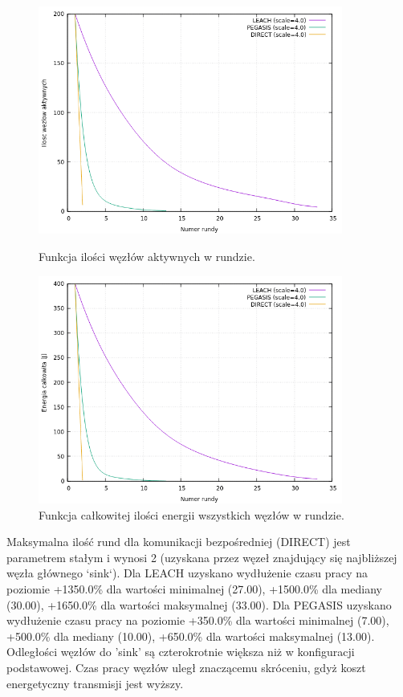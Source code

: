 \documentclass[a4paper,12pt,twoside,openany]{report}
\begin{document}
\begin{figure}[H]
 \centering
 \includegraphics[width=10cm]{images/gnuplot/test_3/nodes_in_round_xy800.png}
 \caption{Funkcja ilości węzłów aktywnych w rundzie.}
 \includegraphics[width=10cm]{images/gnuplot/test_3/energy_in_round_xy800.png}
 \caption{Funkcja całkowitej ilości energii wszystkich węzłów w rundzie.}
\end{figure}

\par
Maksymalna ilość rund dla komunikacji bezpośredniej (DIRECT) jest parametrem stałym i wynosi 2 (uzyskana przez węzeł znajdujący się najbliższej węzła głównego `sink`).
Dla LEACH uzyskano wydłużenie czasu pracy na poziomie +1350.0\% dla wartości minimalnej (27.00), +1500.0\% dla mediany (30.00), +1650.0\% dla wartości maksymalnej (33.00).
Dla PEGASIS uzyskano wydłużenie czasu pracy na poziomie +350.0\% dla wartości minimalnej (7.00), +500.0\% dla mediany (10.00), +650.0\% dla wartości maksymalnej (13.00).
Odległości węzłów do 'sink' są czterokrotnie większa niż w konfiguracji podstawowej. Czas pracy węzłów uległ znaczącemu skróceniu, gdyż koszt energetyczny transmisji jest wyższy.
\end{document}
